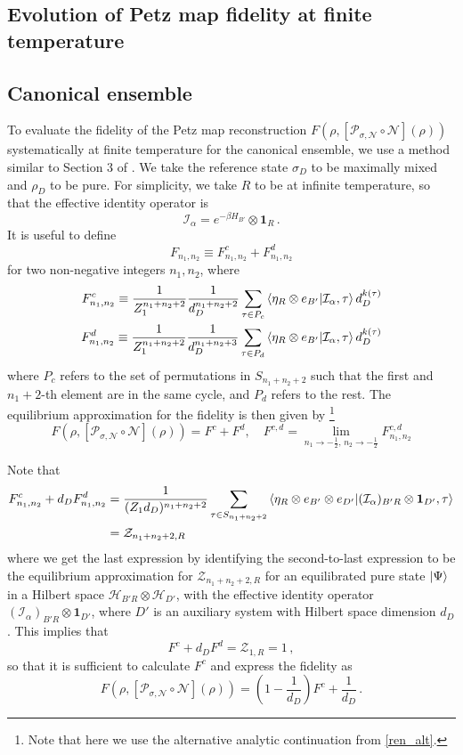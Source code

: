 \documentclass[a4paper,11pt]{article}
\newcommand\half{{\ensuremath{\frac{1}{2}}}}
\newcommand{\be}{\begin{equation}}
\newcommand{\ee}{\end{equation}}
\newcommand\al{{\alpha}}
\newcommand\ha{{\half}}
\newcommand\sI{{\ensuremath{{\mathcal I}}}}
\newcommand\sH{{\ensuremath{{\mathcal H}}}}
\newcommand\sZ{{\mathcal Z}}
\begin{document}
\begin{enumerate}
\begin{appendix}
\section{Evolution of Petz map fidelity at finite temperature}
\label{petz_appendix}

\subsection{Canonical ensemble} \label{petz_app_can}
To evaluate the fidelity of the Petz map reconstruction $F(\rho , [\mathcal{P}_{\sigma,\mathcal{N}}\circ \mathcal{N}](\rho))$ systematically at finite temperature for the canonical ensemble, we use a method similar to Section 3 of \cite{2019arXiv191111977P}. We take the reference state $\sigma_D$ to be maximally mixed and $\rho_D$ to be pure. For simplicity, we take $R$ to be at infinite temperature, so that the effective identity operator is
\be 
\sI_{\al} = e^{-\beta H_{B'}} \otimes \mathbf{1}_R \, . 
\ee
 It is useful to define
\be
F_{n_1, n_2} \equiv F^c_{n_1, n_2} + F^d_{n_1, n_2} 
\ee
for two non-negative integers $n_1, n_2$, where 
\begin{align} 
F^{c}_{n_1, n_2} \equiv \frac{1}{Z_1^{n_1+n_2 +2}} \frac{1}{d_D^{n_1 + n_2 +2}}\sum_{\tau\in P_c} \braket{\eta_R \otimes e_{B'}| \sI_{\al}, \tau} d_D^{k(\tau)} \\ 
 F^{d}_{n_1, n_2} \equiv \frac{1}{Z_1^{n_1+n_2 +2}} \frac{1}{d_D^{n_1 + n_2 +3}}\sum_{\tau\in P_d} \braket{\eta_R \otimes e_{B'}| \sI_{\al}, \tau} d_D^{k(\tau)}
\end{align} 
where $P_c$ refers to the set of permutations in $S_{n_1 + n_2 +2}$ such that the first and $n_1 + 2$-th element are in the same cycle, and $P_d$ refers to the rest. The equilibrium approximation for the fidelity is then given by \footnote{Note that here we use the alternative analytic continuation from \eqref{ren_alt}.} 
\be 
F(\rho , [\mathcal{P}_{\sigma,\mathcal{N}}\circ \mathcal{N}](\rho))= F^c + F^d, \quad F^{c, d} = \lim_{n_1\rightarrow -\ha, \, n_2\rightarrow -\ha}F^{c, d}_{n_1, n_2}
\ee

Note that 
\begin{align} 
F^c_{n_1, n_2} + d_D F^d_{n_1, n_2} &= \frac{1}{(Z_1 d_D)^{n_1+ n_2+2}} \sum_{\tau \in S_{n_1+n_2 +2}} \braket{\eta_R \otimes e_{B'} \otimes e_{D'} | (\sI_{\al})_{B'R} \otimes \mathbf{1}_{D'}, \tau} \\
&= \sZ_{n_1+ n_2 +2, R}
\end{align}
where we get the last expression by identifying the second-to-last expression to be the equilibrium approximation for $\sZ_{n_1+ n_2 +2, R}$ for an equilibrated pure state $\ket{\Psi}$ in a Hilbert space $\sH_{B'R} \otimes \sH_{D'}$, with the effective identity operator $(\sI_{\al})_{B'R} \otimes \mathbf{1}_{D'}$, where $D'$ is an auxiliary system with Hilbert space dimension $d_D$. This implies that 
\be 
F^c + d_D F^d = \sZ_{1, R} = 1\, , \label{cd_rel}
\ee
so that it is sufficient to calculate $F^c$ and express the fidelity as 
\be 
F(\rho , [\mathcal{P}_{\sigma,\mathcal{N}}\circ \mathcal{N}](\rho)) = \left( 1- \frac{1}{d_D}\right) F^c + \frac{1}{d_D}\, . 
\ee



\end{appendix}
\end{enumerate}
\end{document}

